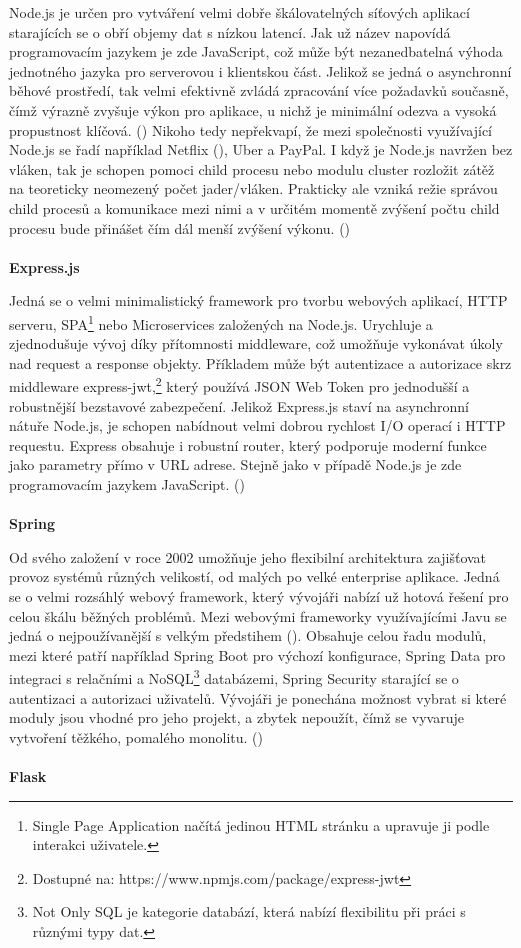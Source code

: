 \documentclass[twoside, 12pt]{article}
\begin{document}
Node.js je určen pro vytváření velmi dobře škálovatelných síťových aplikací starajících se o obří objemy dat s nízkou latencí. Jak už název napovídá programovacím jazykem je zde JavaScript, což může být nezanedbatelná výhoda jednotného jazyka pro serverovou i klientskou část. Jelikož se jedná o asynchronní běhové prostředí, tak velmi efektivně zvládá zpracování více požadavků současně, čímž výrazně zvyšuje výkon pro aplikace, u nichž je minimální odezva a vysoká propustnost klíčová. (\cite{NodeAbout}) Nikoho tedy nepřekvapí, že mezi společnosti využívající Node.js se řadí například Netflix (\cite{NodeNetflix}), Uber a PayPal. I když je Node.js navržen bez vláken, tak je schopen pomoci child procesu nebo modulu cluster rozložit zátěž na teoreticky neomezený počet jader/vláken. Prakticky ale vzniká režie správou child procesů a komunikace mezi nimi a v určitém momentě zvýšení počtu child procesu bude přinášet čím dál menší zvýšení výkonu. (\cite{NodeScalability})
\\
\\
\textbf{Express.js}

Jedná se o velmi minimalistický framework pro tvorbu webových aplikací, HTTP serveru, SPA\footnote{Single Page Application načítá jedinou HTML stránku a upravuje ji podle interakci uživatele.} nebo Microservices založených na Node.js. Urychluje a zjednodušuje vývoj díky přítomnosti middleware, což umožňuje vykonávat úkoly nad request a response objekty. Příkladem může být autentizace a autorizace skrz middleware express-jwt,\footnote{Dostupné na: https://www.npmjs.com/package/express-jwt} který používá JSON Web Token pro jednodušší a robustnější bezstavové zabezpečení. Jelikož Express.js staví na asynchronní nátuře Node.js, je schopen nabídnout velmi dobrou rychlost I/O operací i HTTP requestu. Express obsahuje i robustní router, který podporuje moderní funkce jako parametry přímo v URL adrese. Stejně jako v případě Node.js je zde programovacím jazykem JavaScript. (\cite{Express})
\\
\\
\textbf{Spring}

Od svého založení v roce 2002 umožňuje jeho flexibilní architektura zajišťovat provoz systémů různých velikostí, od malých po velké enterprise aplikace. Jedná se o velmi rozsáhlý webový framework, který vývojáři nabízí už hotová řešení pro celou škálu běžných problémů. Mezi webovými frameworky využívajícími Javu se jedná o nejpoužívanější s velkým předstihem (\cite{SpringSurvey}). Obsahuje celou řadu modulů, mezi které patří například Spring Boot pro výchozí konfigurace, Spring Data pro integraci s relačními a NoSQL\footnote{Not Only SQL je kategorie databází, která nabízí flexibilitu při práci s různými typy dat.} databázemi, Spring Security starající se o autentizaci a autorizaci uživatelů. Vývojáři je ponechána možnost vybrat si které moduly jsou vhodné pro jeho projekt, a zbytek nepoužít, čímž se vyvaruje vytvoření těžkého, pomalého monolitu. (\cite{SpringModuly})
\\
\\
\textbf{Flask}
\end{document}
